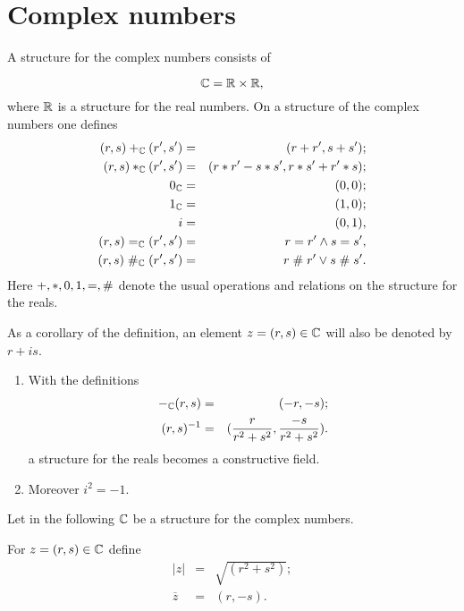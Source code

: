 
\section{Complex numbers}
\begin{definition}
A structure for the complex numbers consists of

$$\mathbb{C}=\mathbb{R}\times \mathbb{R},$$
%
where $\mathbb{R}$ is a structure for the real numbers.
On a structure of the complex numbers one defines
\begin{eqnarray*}
(r,s)+_{\mathbb{C}}(r',s')&=&(r+r',s+s');\\
(r,s)*_{\mathbb{C}}(r',s')&=&(r*r'-s*s',r*s'+r'*s);\\
0_{\mathbb{C}}&=&(0,0);\\
1_{\mathbb{C}}&=&(1,0);\\
i&=&(0,1),\\
(r,s)=_{\mathbb{C}}(r',s')&=&r= r' \wedge s= s',\\
(r,s)\mathrel{\#}_{\mathbb{C}}(r',s')&=&r\mathrel{\#} r' \vee s\mathrel{\#} s'.
\end{eqnarray*}
Here $+,*,0,1,=,\mathrel{\#}$ denote the usual operations and relations on
the structure for the reals.
\end{definition}

\begin{notation}
 As a corollary of the definition, an element $z=(r,s)\in \mathbb{C}$ will
 also be denoted by $r + is$.
\end{notation}

\begin{proposition}
\begin{enumerate}
\item With the definitions
\begin{eqnarray*}
-_{\mathbb{C}}(r,s)&=&(-r,-s);\\
(r,s)^{-1}&=&(\frac{r}{r^2+s^2},\frac{-s}{r^2+s^2}).
\end{eqnarray*}
a structure for the reals becomes a constructive field.
\item
Moreover $i^2=-1$.
\end{enumerate}
\end{proposition}

Let in the following $\mathbb{C}$ be a structure for the complex numbers.

\begin{definition}
For $z=(r,s)\in \mathbb{C}$ define
\begin{eqnarray*}
|z|&=&\sqrt{(r^2+s^2)};\\
\overline{z}&=&(r,-s).
\end{eqnarray*}
\end{definition}

